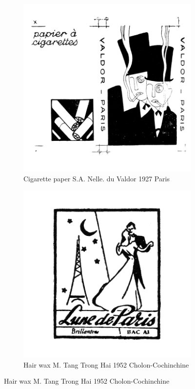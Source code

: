 \begin{figure}[h]
  \begin{subfigure}{.45\textwidth}
    \centering
    \includegraphics[width=.5\linewidth]{images/supplement/trademarks/french/20_7}
    \caption[]{Cigarette paper S.A. Nelle. du Valdor 1927 Paris}
    \label{fig:trademarks:french:20.7}
  \end{subfigure}\hfill
  \begin{subfigure}{.45\textwidth}
    \centering
    \includegraphics[width=.5\linewidth]{images/supplement/trademarks/french/20_21}
    \caption[]{Hair wax M. Tang Trong Hai 1952 Cholon-Cochinchine}
    \label{fig:trademarks:french:20.21}
  \end{subfigure}


\end{figure}
